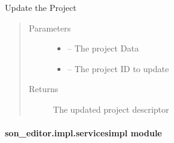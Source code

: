 \documentclass[letterpaper,10pt,english]{sphinxmanual}
\begin{document}
\begin{fulllineitems}
\label{_source/son_editor.impl:son_editor.impl.projectsimpl.update_project}
Update the Project
\begin{quote}\begin{description}
\item[{Parameters}] \leavevmode\begin{itemize}
\item {} 
 -- The project Data

\item {} 
 -- The project ID to update

\end{itemize}

\item[{Returns}] \leavevmode
The updated project descriptor

\end{description}\end{quote}

\end{fulllineitems}



\paragraph{son\_editor.impl.servicesimpl module}
\label{_source/son_editor.impl:son-editor-impl-servicesimpl-module}\label{_source/son_editor.impl:module-son_editor.impl.servicesimpl}
\end{document}

